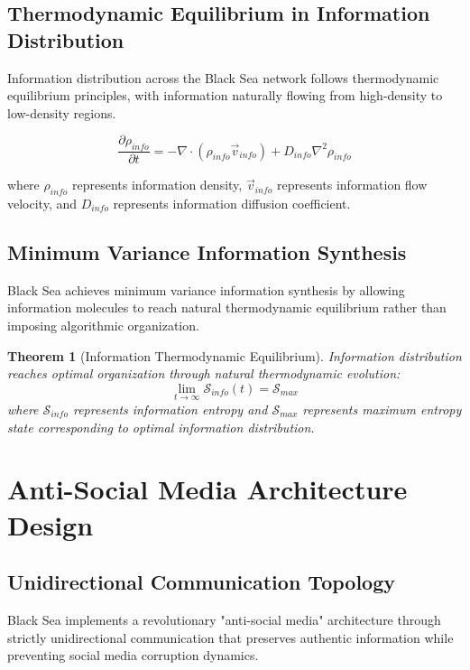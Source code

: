 \documentclass[12pt,a4paper]{article}
\newtheorem{theorem}{Theorem}
\begin{document}
\subsection{Thermodynamic Equilibrium in Information Distribution}

Information distribution across the Black Sea network follows thermodynamic equilibrium principles, with information naturally flowing from high-density to low-density regions.

\begin{equation}
\frac{\partial \rho_{info}}{\partial t} = -\nabla \cdot (\rho_{info} \vec{v}_{info}) + D_{info}\nabla^2\rho_{info}
\end{equation}

where $\rho_{info}$ represents information density, $\vec{v}_{info}$ represents information flow velocity, and $D_{info}$ represents information diffusion coefficient.

\subsection{Minimum Variance Information Synthesis}

Black Sea achieves minimum variance information synthesis by allowing information molecules to reach natural thermodynamic equilibrium rather than imposing algorithmic organization.

\begin{theorem}[Information Thermodynamic Equilibrium]
Information distribution reaches optimal organization through natural thermodynamic evolution:
\begin{equation}
\lim_{t \rightarrow \infty} \mathcal{S}_{info}(t) = \mathcal{S}_{max}
\end{equation}
where $\mathcal{S}_{info}$ represents information entropy and $\mathcal{S}_{max}$ represents maximum entropy state corresponding to optimal information distribution.
\end{theorem}

\section{Anti-Social Media Architecture Design}

\subsection{Unidirectional Communication Topology}

Black Sea implements a revolutionary "anti-social media" architecture through strictly unidirectional communication that preserves authentic information while preventing social media corruption dynamics.
\end{document}
